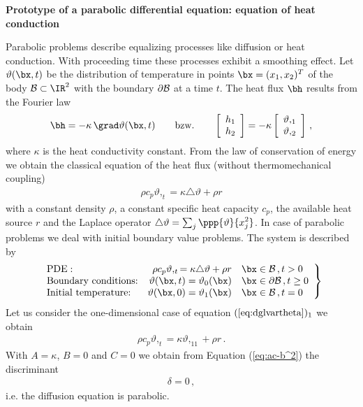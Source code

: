 {\bf Prototype of a parabolic differential equation: 
equation of heat conduction}

Parabolic problems describe equalizing processes like 
diffusion or heat conduction. 
With proceeding time these processes exhibit a smoothing 
effect. 
Let $\vartheta ( \bx, t)$ be the distribution of 
temperature in points $\bx = (x_1 , x_2)^T$ of the body ${\cal B}\subset\IR^2$
with the boundary $\partial {\cal B} $ at a time $t$. 
The heat flux $\bh$ results from the Fourier law 
%
\begin{eqnarray}
\bh = - \kappa \, \grad \vartheta (\bx,t) \qquad \mbox{bzw.} \qquad
\left[ 
\begin{array}{c}
h_1 \\ h_2
\end{array}
\right]
= - \kappa
\left[ 
\begin{array}{c}
\vartheta,_1 \\ \vartheta,_2 
\end{array}
\right] \, ,
\end{eqnarray}
%
where $\kappa$ is the heat conductivity constant. 
From the law of conservation of energy we obtain the 
classical equation of the heat flux (without 
thermomechanical coupling) 
%
\begin{eqnarray}
\rho c_p \vartheta,_t = \kappa \triangle \vartheta+ \rho r
\end{eqnarray}
%
with a constant density $\rho$, a constant specific heat 
capacity $c_p$, the available heat source $r$ and the
Laplace operator $\triangle \vartheta = \sum_j \displaystyle
\ppp{\vartheta}{x_j^2}$. 
In case of parabolic problems we deal with initial boundary 
value problems. 
The system is described by 
%
\begin{eqnarray}
\left. 
\begin{array}{lrl}
\mbox{PDE}: & \rho c_p \vartheta,_t = \kappa \triangle \vartheta + \rho r 
& \bx \in {\cal B} \, , t>0 \\
\mbox{Boundary conditions:} & \vartheta(\bx,t) = \vartheta_0 (\bx) & \bx \in
\partial {\cal B} \, ,t \ge 0 \\
\mbox{Initial temperature:} & \vartheta(\bx , 0) = \vartheta_1 (\bx) & \bx 
\in {\cal B} \, , t=0
\end{array}
\right\}
\label{eq:dglvartheta}
\end{eqnarray}
%
Let us consider the one-dimensional case of equation 
$(\ref{eq:dglvartheta})_1$ we obtain 
%
\begin{eqnarray}
\rho c_p \vartheta,_t = \kappa \vartheta,_{11}+ \rho r \, .
\end{eqnarray}
%
With $A=\kappa$, $B=0$ and $C=0$ we obtain from 
Equation (\ref{eq:ac-b^2}) the discriminant 
%
\begin{eqnarray}
\delta = 0 \, ,
\end{eqnarray}
%
i.e. the diffusion equation is parabolic. 












